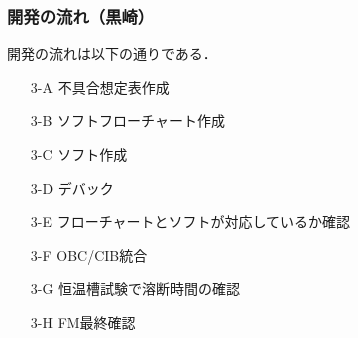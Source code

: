 \newpage
\subsubsection{開発の流れ（黒崎）}
開発の流れは以下の通りである．
\begin{itemize}
	\item[3-A] 不具合想定表作成
	\item[3-B] ソフトフローチャート作成
	\item[3-C] ソフト作成
	\item[3-D] デバック
	\item[3-E] フローチャートとソフトが対応しているか確認
	\item[3-F] OBC/CIB統合
	\item[3-G] 恒温槽試験で溶断時間の確認
	\item[3-H] FM最終確認
\end{itemize}

